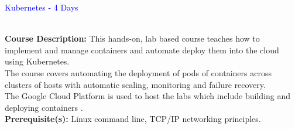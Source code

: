 \documentclass[a4paper,11pt]{article}
\begin{document}
\textcolor{blue}{\LARGE Kubernetes - 4 Days}

\vspace{5mm}

\textbf {\large \\ Course Description:}
This hands-on, lab based course 
teaches how to implement
and manage containers and automate deploy them into the cloud using Kubernetes. \\

The course covers automating the deployment of pods of containers across clusters of hosts
with automatic scaling, monitoring and failure recovery.\\

The Google Cloud Platform is used to host the labs which include 
building and deploying containers . \\
\textbf {Prerequisite(s):} Linux command line, TCP/IP networking principles.
\end{document}
